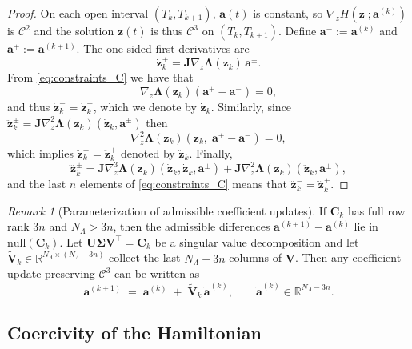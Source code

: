 \documentclass[11pt, a4paper]{article}
\theoremstyle{plain}
\theoremstyle{definition}
\theoremstyle{remark}
\newtheorem{remark}[theorem]{Remark}
\begin{document}
\begin{proof}
On each open interval \((T_{k},T_{k+1})\), $\mathbf{a}(t)$ is constant, so \(\nabla_z H(\mathbf{z}\; ;\mathbf{a}^{(k)})\) is \(\mathcal C^2\) and the solution $\mathbf{z}(t)$ is thus \(\mathcal C^3\) on \((T_{k},T_{k+1})\).
Define
\(
\mathbf{a}^-:=\mathbf{a}^{(k)}\) and \(\mathbf{a}^+:=\mathbf{a}^{(k+1)}
\).
The one-sided first derivatives are
\[
\dot{\mathbf{z}}_k^\pm = \mathbf{J}\nabla_z\boldsymbol{\Lambda}(\mathbf{z}_k)\,\mathbf{a}^\pm.
\]
From \eqref{eq:constraints_C} we have that
 \[
\nabla_z\boldsymbol{\Lambda}(\mathbf{z}_k)(\mathbf{a}^+-\mathbf{a}^-)=0,
\]
and thus \(\dot{\mathbf{z}}_k^-=\dot{\mathbf{z}}_k^+\), which we denote by \(\dot{\mathbf{z}}_k\). Similarly, since $\ddot{\mathbf{z}}_k^{\pm} = \mathbf{J}\nabla_z^2\boldsymbol{\Lambda}(\mathbf{z}_k)(\dot{\mathbf{z}}_k,\mathbf{a}^{\pm})$ then \[
\nabla_z^2\boldsymbol{\Lambda}(\mathbf{z}_k)\!\left(\dot{\mathbf{z}}_k,\;\mathbf{a}^+-\mathbf{a}^-\right)=0,
\]
which implies \(\ddot{\mathbf{z}}_k^-=\ddot{\mathbf{z}}_k^+\) denoted by \(\ddot{\mathbf{z}}_k\). Finally,
\[
\dddot{\mathbf{z}}_k^\pm =
\mathbf{J}\nabla_z^3\boldsymbol{\Lambda}(\mathbf{z}_k)\!\left(\dot{\mathbf{z}}_k,\dot{\mathbf{z}}_k,\mathbf{a}^\pm\right)
+\mathbf{J}\nabla_z^2\boldsymbol{\Lambda}(\mathbf{z}_k)\!\left(\ddot{\mathbf{z}}_k,\mathbf{a}^\pm\right),
\]
and the last $n$ elements of \eqref{eq:constraints_C} means that \(\dddot{\mathbf{z}}_k^-=\dddot{\mathbf{z}}_k^+\).
\end{proof}

 
 
\begin{remark}[Parameterization of admissible coefficient updates]
If \(\mathbf{C}_k\) has full row rank \(3n\) and \(N_\Lambda>3n\), then the admissible differences \(\mathbf{a}^{(k+1)}-\mathbf{a}^{(k)}\) lie in \(\mathrm{null}(\mathbf{C}_k)\).
Let \(\mathbf{U}\boldsymbol{\Sigma}\mathbf{V}^\top=\mathbf{C}_k\) be a singular value decomposition and let \(\tilde{\mathbf{V}}_k\in\mathbb{R}^{N_\Lambda\times (N_\Lambda-3n)}\) collect the last \(N_\Lambda-3n\) columns of \(\mathbf{V}\).
Then any coefficient update preserving \(\mathcal C^3\) can be written as
\[
\mathbf{a}^{(k+1)} \;=\; \mathbf{a}^{(k)} \;+\; \tilde{\mathbf{V}}_k\,\tilde{\mathbf{a}}^{(k)},\qquad \tilde{\mathbf{a}}^{(k)} \in\mathbb{R}^{N_\Lambda-3n}.
\]
\end{remark}

 




 
\subsection{Coercivity of the Hamiltonian}\label{sec:coercivity}
\end{document}
